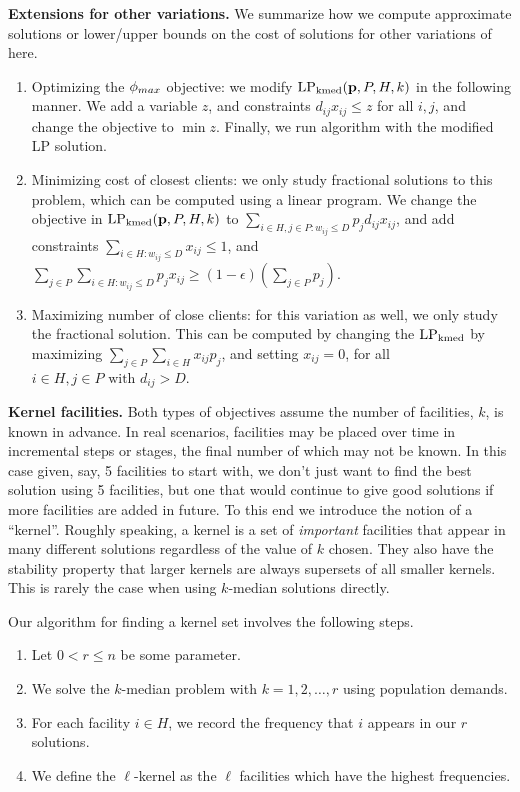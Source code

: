 \noindent
\textbf{Extensions for other variations.}
We summarize how we compute approximate solutions or lower/upper bounds on the cost of solutions for
other variations of \probstatic{} here.
\begin{enumerate}
\item
Optimizing the $\phi_{max}$ objective: we modify $\text{LP}_{\text{kmed}}(\mathbf{p}, P, H, k)$ in the following manner.
We add a variable $z$, and constraints $d_{ij} x_{ij} \leq z$ for all $i, j$, and
change the objective to $\min z$. Finally, we run algorithm \algokmedstatic{} with the modified LP solution.
\item
Minimizing cost of closest clients: 
we only study fractional solutions to this problem, which can be computed using a linear program.
We change the objective in $\text{LP}_{\text{kmed}}(\mathbf{p}, P, H, k)$
to $\sum_{i \in H, j \in P: w_{ij} \leq D} p_j d_{ij} x_{ij}$,
and add constraints $\sum_{i \in H: w_{ij} \leq D} x_{ij} \leq 1$, and
$\sum_{j \in P} \sum_{i \in H: w_{ij} \leq D} p_j x_{ij} \geq  (1-\epsilon) \left( \sum_{j \in P}p_j \right)$.
\item
Maximizing number of close clients:
for this variation as well, we only study the fractional solution. This can be computed by changing the
$\text{LP}_{\text{kmed}}$ by maximizing $\sum_{j\in P}\sum_{i\in H} x_{ij}p_j$, and setting $x_{ij} = 0$,
for all $i\in H, j\in P \mbox{ with }d_{ij}>D$.
\end{enumerate}

\noindent
\textbf{Kernel facilities.}
Both types of objectives assume the number of facilities, $k$, is known in advance.
In real scenarios, facilities may be placed over time in incremental steps or stages, the final number of which may not be known. In this case given, say, 5 facilities to start with, we don't just want to find the best solution using 5 facilities, but one that would continue to give good solutions if more facilities are added in future.
To this end we introduce the notion of a ``kernel''. 
Roughly speaking, a kernel is a set of \textit{important} facilities that appear in many different solutions regardless of the value of $k$ chosen. They also have the stability property that larger kernels are always supersets of all smaller kernels. This is rarely the case when using $k$-median solutions directly.

Our algorithm \algokernelkmed{} for finding a kernel set involves the following steps.
\begin{enumerate}
\item
Let $0 < r \leq n$ be some parameter. 
\item
We solve the $k$-median problem with $k = 1, 2, \ldots, r$ using population demands. 
\item
For each facility $i \in H$, we record the frequency that $i$ appears in our $r$ solutions.
\item
We define the $\ell$-kernel as the $\ell$ facilities which have the highest frequencies. 
\end{enumerate}



